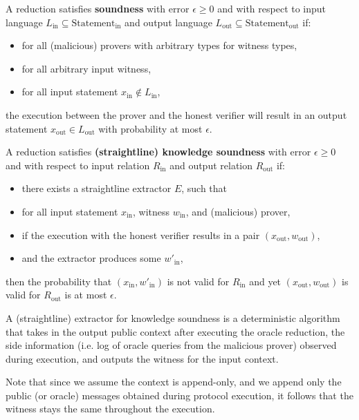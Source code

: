 \begin{definition}[Soundness]
    \label{def:soundness}
    A reduction satisfies \textbf{soundness} with error $\epsilon \geq 0$ and with respect to input
    language $L_{\text{in}} \subseteq \text{Statement}_{\text{in}}$ and output language $L_{\text{out}} \subseteq \text{Statement}_{\text{out}}$ if:
    \begin{itemize}
        \item for all (malicious) provers with arbitrary types for witness types,
        \item for all arbitrary input witness,
        \item for all input statement $x_{\text{in}} \notin L_{\text{in}}$,
    \end{itemize}
    the execution between the prover and the honest verifier will result in an output statement
    $x_{\text{out}} \in L_{\text{out}}$ with probability at most $\epsilon$.
\end{definition}

\begin{definition}
    \label{def:knowledge_soundness}
    A reduction satisfies \textbf{(straightline) knowledge soundness} with error $\epsilon \geq 0$ and
    with respect to input relation $R_{\text{in}}$ and output relation $R_{\text{out}}$ if:
    \begin{itemize}
        \item there exists a straightline extractor $E$, such that
        \item for all input statement $x_{\text{in}}$, witness $w_{\text{in}}$, and (malicious) prover,
        \item if the execution with the honest verifier results in a pair $(x_{\text{out}}, w_{\text{out}})$,
        \item and the extractor produces some $w'_{\text{in}}$,
    \end{itemize}
    then the probability that $(x_{\text{in}}, w'_{\text{in}})$ is not valid for $R_{\text{in}}$ and yet $(x_{\text{out}}, w_{\text{out}})$ is valid for $R_{\text{out}}$ is at most $\epsilon$.

    A (straightline) extractor for knowledge soundness is a deterministic algorithm that takes in the output public context after executing the oracle reduction, the side information (i.e. log of oracle queries from the malicious prover) observed during execution, and outputs the witness for the input context.

    Note that since we assume the context is append-only, and we append only the public (or oracle)
    messages obtained during protocol execution, it follows that the witness stays the same throughout
    the execution.
\end{definition}

